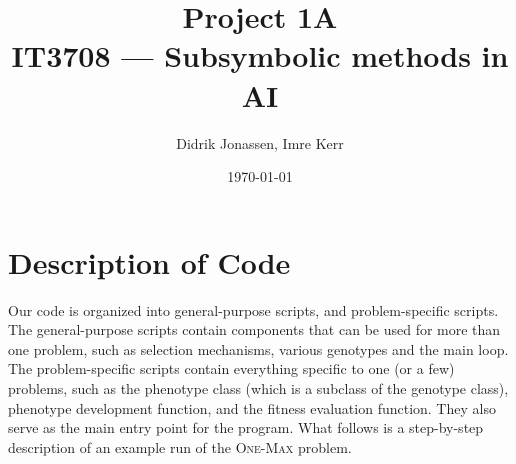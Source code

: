 \documentclass[a4paper,12pt]{article}
\author{Didrik Jonassen, Imre Kerr}
\title{Project 1A\\ IT3708 --- Subsymbolic methods in AI}
\date{\today}
\begin{document}
\maketitle

\section{Description of Code}
Our code is organized into general-purpose scripts, and problem-specific scripts. The general-purpose scripts contain components that can be used for more than one problem, such as selection mechanisms, various genotypes and the main loop. The problem-specific scripts contain everything specific to one (or a few) problems, such as the phenotype class (which is a subclass of the genotype class), phenotype development function, and the fitness evaluation function. They also serve as the main entry point for the program. What follows is a step-by-step description of an example run of the \textsc{One-Max} problem.
\end{document}
